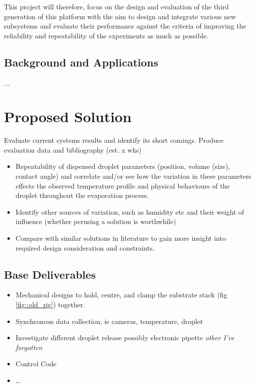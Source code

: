 \documentclass[11pt, a4paper, twoside, openright]{report}
\begin{document}
This project will therefore, focus on the design and evaluation of the third generation of this platform with the aim to design and integrate various new subsystems and evaluate their performance against the criteria of improving the reliability and repeatability of the experiments as much as possible.

\subsection{Background and Applications}
...

\section{Proposed Solution}

Evaluate current systems results and identify its short comings. Produce evaluation data and bibliography (est. x wks)
\begin{itemize}
  \item Repeatability of dispensed droplet parameters (position, volume (size), contact angle) and correlate and/or see how the variation in these parameters effects the observed temperature profile and physical behaviours of the droplet throughout the evaporation process.
  \item Identify other sources of variation, such as humidity etc and their weight of influence (whether perusing a solution is worthwhile)
  \item Compare with similar solutions in literature to gain more insight into required design consideration and constraints.
\end{itemize}



\subsection{Base Deliverables}
\begin{itemize}
  \item Mechanical designs to hold, centre, and clamp the substrate stack (fig \ref{fig::old_rig}) together.
  \item Synchronous data collection, ie cameras, temperature, droplet
  \item Investigate different droplet release possibly electronic pipette \textit{other I've forgotten}
  \item Control Code
  \item \dots
\end{itemize}
\end{document}
